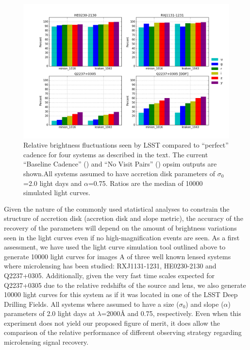 \begin{center}
	\begin{figure}[hbt]
		\includegraphics[width=\textwidth]{figs/agn/ulens_sim.png}
		\caption{Relative brightness fluctuations seen by LSST compared to ``perfect'' cadence for four systems as described in the text. The current ``Baseline Cadence'' () and ``No Visit Pairs''	() opsim outputs are shown.All systems assumed to have accretion disk parameters of $\sigma_0$=2.0 light days and $\alpha$=0.75. Ratios are the median of 10000 simulated light curves.}
		\label{ulens_sim}
	\end{figure}
\end{center}


Given the nature of the commonly used statistical analyses to constrain the structure of accretion disk (accretion disk and slope metric), the accuracy of the recovery of the parameters will depend on the amount of brightness variations seen in the light curves even if no high-magnification events are seen. As a first assessment, we have used the light curve simulation tool outlined above to generate 10000 light curves for images A of three well known lensed systems where microlensing has been studied: RXJ1131-1231, HE0230-2130 and Q2237+0305. Additionally, given the very fast time scales expected for Q2237+0305 due to the relative redshifts of the source and lens, we also generate 10000 light curves for this system as if it was located in one of the LSST Deep Drilling Fields. All systems where assumed to have a size ($\sigma_0$) and slope ($\alpha$) parameters of 2.0 light days at $\lambda$=2000\AA{} and 0.75, respectively. Even when this experiment does not yield our proposed figure of merit, it does allow the comparison of the relative performance of different observing strategy regarding microlensing signal recovery.

